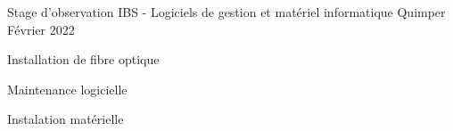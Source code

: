 

\begin{cventries}

  \cventry
    {Stage d'observation} %
    {IBS - Logiciels de gestion et matériel informatique} %
    {Quimper} %
    {Février 2022} %
    {
      \begin{cvitems} %
        \item {Installation de fibre optique}
        \item {Maintenance logicielle}
        \item {Instalation matérielle}
      \end{cvitems}
    }


\end{cventries}
